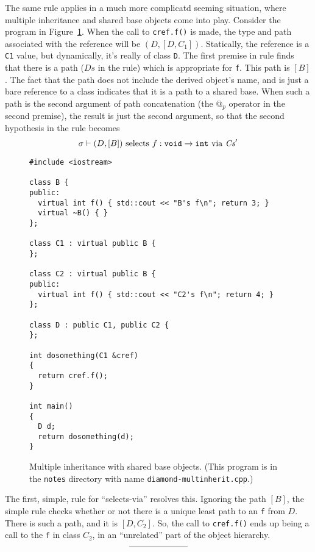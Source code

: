 \documentclass[11pt]{article}
\begin{document}
The same rule applies in a much more complicatd seeming situation,
where multiple inheritance and shared base objects come into play.
Consider the program in Figure~\ref{fig:diamond-cpp}.  When the call
to \texttt{cref.f()} is made, the type and path associated with the
reference will be $(D,[D,C_1])$.  Statically, the reference is a
\texttt{C1} value, but dynamically, it's really of class
\texttt{D}. The first premise in rule 
finds that there is a path ($\mathit{Ds}$ in the rule) which is
appropriate for \texttt{f}.  This path is $[B]$.  The fact that the
path does not include the derived object's name, and is just a bare
reference to a class indicates that it is a path to a shared base.
When such a path is the second argument of path concatenation (the
$@_p$ operator in the second premise), the result is just the second
argument, so that the second hypothesis in the rule becomes
\[
\sigma \vdash (D,[B]) \textrm{ selects } f :
\texttt{void} \rightarrow \texttt{int} \textrm{ via } \mathit{Cs}'
\]
\begin{figure}[hbtp]
\begin{verbatim}
#include <iostream>

class B {
public:
  virtual int f() { std::cout << "B's f\n"; return 3; }
  virtual ~B() { }
};

class C1 : virtual public B {
};

class C2 : virtual public B {
public:
  virtual int f() { std::cout << "C2's f\n"; return 4; }
};

class D : public C1, public C2 {
};

int dosomething(C1 &cref)
{
  return cref.f();
}

int main()
{
  D d;
  return dosomething(d);
}
\end{verbatim}
\label{fig:diamond-cpp}
\caption{Multiple inheritance with shared base objects.  (This program is
in the \texttt{notes} directory with name \texttt{diamond-multinherit.cpp}.)}
\end{figure}

The first, simple, rule for ``selects-via'' resolves this.  Ignoring
the path $[B]$, the simple rule checks whether or not there is a
unique least path to an \texttt{f} from $D$.  There is such a path,
and it is $[D,C_2]$.  So, the call to \texttt{cref.f()} ends up being
a call to the \texttt{f} in class $C_2$, in an ``unrelated'' part of
the object hierarchy.
\[
\rule{0.2\textwidth}{.1mm}
\]
\end{document}
